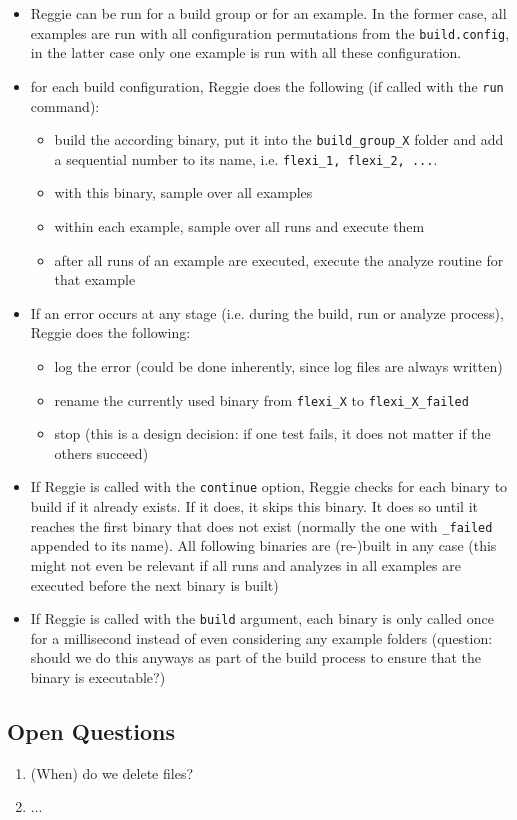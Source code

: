 \documentclass[11pt]{scrartcl}
\begin{document}
\begin{itemize}
 \item Reggie can be run for a build group or for an example. In the former case, all examples are run with all configuration permutations from the \texttt{build.config}, in the latter case only one example is run with all these configuration. 
 \item for each build configuration, Reggie does the following (if called with the \texttt{run} command): 
 \begin{itemize}
  \item build the according binary, put it into the \texttt{build\_group\_X} folder and add a sequential number to its name, i.e. \texttt{flexi\_1, flexi\_2, ...}.
  \item with this binary, sample over all examples
  \item within each example, sample over all runs and execute them
  \item after all runs of an example are executed, execute the analyze routine for that example 
 \end{itemize}
 \item If an error occurs at any stage (i.e. during the build, run or analyze process), Reggie does the following:
 \begin{itemize}
  \item log the error (could be done inherently, since log files are always written)
  \item rename the currently used binary from \texttt{flexi\_X} to \texttt{flexi\_X\_failed}
  \item stop (this is a design decision: if one test fails, it does not matter if the others succeed)
 \end{itemize}
 \item If Reggie is called with the \texttt{continue} option, Reggie checks for each binary to build if it already exists. If it does, it skips this binary. It does so until it reaches the first binary that does not exist (normally the one with \texttt{\_failed} appended to its name). All following binaries are (re-)built in any case (this might not even be relevant if all runs and analyzes in all examples are executed before the next binary is built)
 \item If Reggie is called with the \texttt{build} argument, each binary is only called once for a millisecond instead of even considering any example folders (question: should we do this anyways as part of the build process to ensure that the binary is executable?)


\end{itemize}



\subsection{Open Questions}

\begin{enumerate}
 \item (When) do we delete files?
 \item ... 
\end{enumerate}
\end{document}
